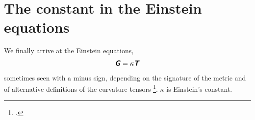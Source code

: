 \documentclass[\ifafour a4paper,12pt,\else a5paper,10pt,\fi%
onecolumn,oneside,article,%
british%
]{memoir}
\makeatletter
\theoremstyle{remark}
\theoremstyle{innote}
\newcommand*{\mathte}[1]{\textbf{\textit{\textsf{#1}}}}
\newcommand*{\citep}{\footcites}
\newcommand*{\amp}{\&}
\renewcommand*{\|}[1][]{\nonscript\,#1\vert\nonscript\;\mathopen{}}
\newcommand*{\sect}{\S}%
\newcommand*{\chap}{ch.}%
\newcommand*{\etal}{{et al.}}
\newcommand*{\puzzle}{{\fontencoding{U}\fontfamily{fontawesometwo}\selectfont\symbol{225}}}
\newcommand{\mynote}[1]{ {\color{notecolour}\puzzle\ #1}}
\newcommand*{\q}{}%
\DeclareRobustCommand*{\q}{%
  \mathbin{\mathpalette\bigcdot@{}}%
}
\newcommand*{\bigcdot@scalefactor}{0.7}
\newcommand*{\bigcdot@widthfactor}{1.5}
\newcommand*{\bigcdot@}[2]{%
  \sbox0{$#1\vcenter{}$}%
  \sbox2{$#1\cdot\m@th$}%
  \hbox to \bigcdot@widthfactor\wd2{%
    \hfil
    \raise\ht0\hbox{%
      \scalebox{\bigcdot@scalefactor}{%
        \lower\ht0\hbox{$#1\bullet\m@th$}%
      }%
    }%
    \hfil
  }%
}
\newcommand*{\yT}{\bm{\mathcal{T}}}
\newcommand*{\yTe}{\mathte{T}}
\newcommand*{\yG}{\mathte{G}}
\renewcommand*{\i}{\indices}
\newcommand*{\yk}{\kappa}
\newcommand*{\yt}{\sigma}
\newcommand*{\rul}{{\mkern2mu\rule[-0.1ex]{0.75pt}{1.1ex}\mkern2mu}}
\DeclarePairedDelimiter\mul{\rul}{\rul}%
\makeatother
\begin{document}








\section{The constant in the Einstein equations}
\label{sec:einstein_eq}

We finally arrive at the Einstein equations,
\begin{equation}
  \label{eq:einstein}
  \yG%
  = \yk \yTe%
\end{equation}
sometimes seen with a minus sign, depending on the signature of the metric
and of alternative definitions of the curvature tensors \citep[see the
\emph{Table of sign conventions} on the final pages
of][]{misneretal1970_r1973}. $\yk$ is Einstein's constant.
\end{document}

